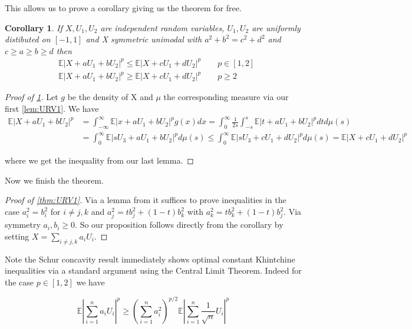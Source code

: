 \documentclass[10pt]{article}
\newcommand{\E}{\mathbb{E}}
\newcommand{\1}{\textbf{1}}
\newcommand{\normOne}[1]{\left\lvert#1\right\rvert}
\newcommand{\lparen}{\left(}
\newcommand{\rparen}{\right)}
\newtheorem{corollary}[theorem]{Corollary}
\theoremstyle{remark}
\theoremstyle{definition}
\begin{document}
This allows us to prove a corollary giving us the theorem for free.

\begin{corollary}\label{cor:URV1}
	If $X,U_1,U_2$ are independent random variables, $U_1,U_2$ are uniformly distibuted on $[-1,1]$ and X symmetric unimodal with $a^2+b^2 = c^2+d^2$ and $c \geq a \geq b \geq d$ then
	\begin{align*}
		&\E|X + aU_1 + bU_2|^p \leq \E |X+cU_1 + dU_2|^p \qquad p \in [1,2]\\
		&\E|X + aU_1 + bU_2|^p \geq \E |X+cU_1 + dU_2|^p \qquad p \geq 2
	\end{align*}
\end{corollary}

\begin{proof}[Proof of \ref{cor:URV1}]
	Let $g$ be the density of X and $\mu$ the corresponding measure via our first \ref{lem:URV1}. We have
	\begin{align*}
		\E|X + aU_1 + bU_2|^p &= \int_{-\infty}^{\infty}\E|x+aU_1 + bU_2|^p g(x)dx = \int_0^{\infty}\frac{1}{2s}\int_{-s}^s \E|t+aU_1 + bU_2|^p dt d\mu(s)\\
		&= \int_0^{\infty} \E|sU_3 + aU_1 + bU_2|^p d\mu(s) \leq \int_0^{\infty} \E|sU_3 + cU_1 +d U_2|^p d\mu(s) = \E |X + cU_1 + dU_2|^p
	\end{align*}

	where we get the inequality from our last lemma.
\end{proof}

Now we finish the theorem.

\begin{proof}[Proof of \ref{thm:URV1}]

	Via a lemma from \cite{MO} it suffices to prove inequalities in the case $a_i^2 = b_i^2$ for $i \neq j,k$ and $a_j^2 = tb_j^2 + (1-t)b_k^2$ with $a_k^2 = tb_k^2+(1-t)b_j^2$. Via symmetry $ a_i,b_i \geq 0$. So our proposition follows directly from the corollary by setting $X = \sum_{i \neq j,k} a_iU_i$. 
\end{proof}

Note the Schur concavity result immediately shows optimal constant Khintchine inequalities via a standard argument using the Central Limit Theorem. Indeed for the case $p \in [1,2]$ we have

\begin{equation*}
	\E \normOne{\sum_{i=1}^n a_iU_i}^p \geq \lparen\sum_{i=1}^na_i^2\rparen^{p/2}\E\normOne{\sum_{i=1}^n \frac{1}{\sqrt{n}}U_i}^p
\end{equation*}
\end{document}
